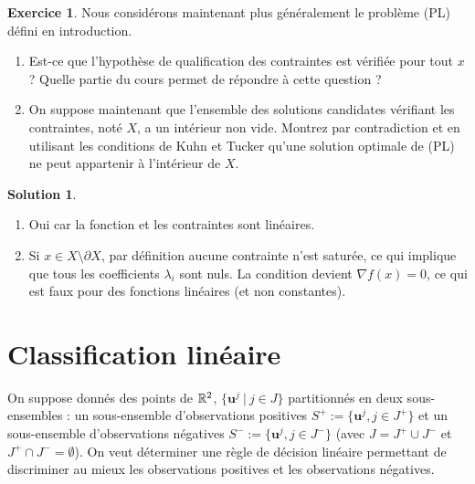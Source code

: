 \documentclass[a4paper,francais]{article}
\newcommand{\R}{{\ensuremath\mathbb{R}}}
\theoremstyle{definition}
\newtheorem{exercice}{Exercice}[section]
\newtheorem*{solution}{Solution}
\begin{document}
\begin{exercice}
  Nous considérons maintenant plus généralement le problème (PL) défini
  en introduction. 
  \begin{enumerate}
  \item Est-ce que l'hypothèse de qualification des contraintes est vérifiée
    pour tout $x$ ? Quelle partie du cours permet de répondre à cette question ?
  \item On suppose maintenant que l'ensemble des solutions candidates vérifiant
    les contraintes, noté $X$, a un intérieur non vide. Montrez par contradiction et en utilisant les conditions de Kuhn et Tucker qu'une solution optimale de (PL) ne peut appartenir à l'intérieur de $X$.
  \end{enumerate}
\end{exercice}

\begin{solution}
  \begin{enumerate}
  \item Oui car la fonction et les contraintes sont linéaires.
  \item Si $x \in X \setminus \partial X$, par définition aucune contrainte n'est saturée,
  ce qui implique que tous les coefficients $\lambda_i$ sont nuls. La condition
  devient ${\nabla f}(x) = 0$, ce qui est faux pour des fonctions linéaires (et non
  constantes).
  \end{enumerate}
\end{solution}

\section{Classification linéaire}
\label{sec:classif}

\let\vec\mathbf

On suppose donnés des points de $\R^2$, $\{\vec{u}^j \ | \ {j \in J} \}$ partitionnés en deux sous-ensembles :
un sous-ensemble d'observations positives $S^+ := \{ \vec{u}^j, j \in J^+ \}$ et un sous-ensemble
d'observations négatives $S^- := \{ \vec{u}^j, j \in J^- \}$
(avec $J = J^+ \cup J^-$ et $J^+ \cap J^- = \emptyset$).
On veut déterminer une règle de décision linéaire permettant de discriminer au mieux
les observations positives et les observations négatives.
\end{document}
